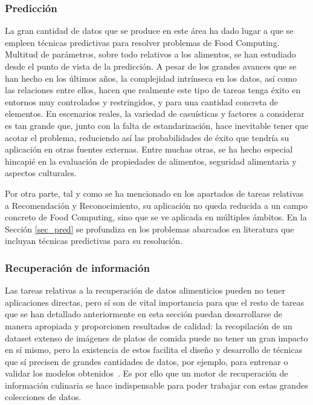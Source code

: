\subsubsection{Predicción}
La gran cantidad de datos que se produce en este área ha dado lugar a que se empleen técnicas predictivas para resolver problemas de Food Computing. Multitud de parámetros, sobre todo relativos a los alimentos, se han estudiado desde el punto de vista de la predicción.  A pesar de los grandes avances que se han hecho en los últimos años, la complejidad intrínseca en los datos, así como las relaciones entre ellos, hacen que realmente este tipo de tareas tenga éxito en entornos muy controlados y restringidos, y para una cantidad concreta de elementos. En escenarios reales, la variedad de casuísticas y factores a considerar es tan grande que, junto con la falta de estandarización, hace inevitable tener que acotar el problema, reduciendo así las probabilidades de éxito que tendría su aplicación en otras fuentes externas. Entre muchas otras, se ha hecho especial hincapié en la evaluación de propiedades de alimentos, seguridad alimentaria y aspectos culturales. 

Por otra parte, tal y como se ha mencionado en los apartados de tareas relativas a Recomendación y Reconocimiento, su aplicación no queda reducida a un campo concreto de Food Computing, sino que se ve aplicada en múltiples ámbitos. En la Sección \ref{sec_pred} se profundiza en los problemas abarcados en literatura que incluyan técnicas predictivas para su resolución.

\subsubsection{Recuperación de información}
Las tareas relativas a la recuperación de datos alimenticios pueden no tener aplicaciones directas, pero sí son de vital importancia para que el resto de tareas que se han detallado anteriormente en esta sección puedan desarrollarse de manera apropiada y proporcionen resultados de calidad: la recopilación de un dataset extenso de imágenes de platos de comida puede no tener un gran impacto en sí mismo, pero la existencia de estos facilita el diseño y desarrollo de técnicas que sí precisen de grandes cantidades de datos, por ejemplo, para entrenar o validar los modelos obtenidos~\cite{marin2019recipe1m+}. Es por ello que un motor de recuperación de información culinaria se hace indispensable para poder trabajar con estas grandes colecciones de datos.


